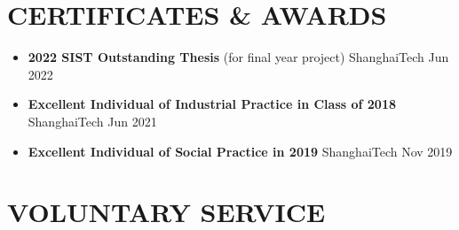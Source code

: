 \documentclass[a4paper,10pt]{ctexart} %
\begin{document}
\section{CERTIFICATES \& AWARDS}

    \begin{itemize}
        \item \textbf{2022 SIST Outstanding Thesis} {\small (for final year project)} \hfill ShanghaiTech \quad Jun 2022
        \item \textbf{Excellent Individual of Industrial Practice in Class of 2018} \hfill ShanghaiTech \quad Jun 2021
        \item \textbf{Excellent Individual of Social Practice in 2019} \hfill ShanghaiTech \quad Nov 2019
    \end{itemize}



\section{VOLUNTARY SERVICE}
\end{document}

